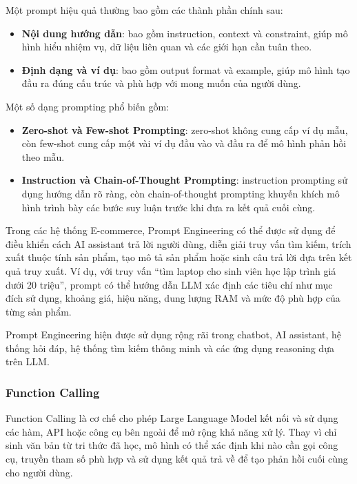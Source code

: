 Một prompt hiệu quả thường bao gồm các thành phần chính sau:

\begin{itemize}
    \item \textbf{Nội dung hướng dẫn}: bao gồm instruction, context và constraint, giúp mô hình hiểu nhiệm vụ, dữ liệu liên quan và các giới hạn cần tuân theo.
    \item \textbf{Định dạng và ví dụ}: bao gồm output format và example, giúp mô hình tạo đầu ra đúng cấu trúc và phù hợp với mong muốn của người dùng.
\end{itemize}

Một số dạng prompting phổ biến gồm:

\begin{itemize}
    \item \textbf{Zero-shot và Few-shot Prompting}: zero-shot không cung cấp ví dụ mẫu, còn few-shot cung cấp một vài ví dụ đầu vào và đầu ra để mô hình phản hồi theo mẫu.
    \item \textbf{Instruction và Chain-of-Thought Prompting}: instruction prompting sử dụng hướng dẫn rõ ràng, còn chain-of-thought prompting khuyến khích mô hình trình bày các bước suy luận trước khi đưa ra kết quả cuối cùng.
\end{itemize}

Trong các hệ thống E-commerce, Prompt Engineering có thể được sử dụng để điều khiển cách AI assistant trả lời người dùng, diễn giải truy vấn tìm kiếm, trích xuất thuộc tính sản phẩm, tạo mô tả sản phẩm hoặc sinh câu trả lời dựa trên kết quả truy xuất. Ví dụ, với truy vấn ``tìm laptop cho sinh viên học lập trình giá dưới 20 triệu'', prompt có thể hướng dẫn LLM xác định các tiêu chí như mục đích sử dụng, khoảng giá, hiệu năng, dung lượng RAM và mức độ phù hợp của từng sản phẩm.

Prompt Engineering hiện được sử dụng rộng rãi trong chatbot, AI assistant, hệ thống hỏi đáp, hệ thống tìm kiếm thông minh và các ứng dụng reasoning dựa trên LLM.

\subsubsection{Function Calling}

Function Calling là cơ chế cho phép Large Language Model kết nối và sử dụng các hàm, API hoặc công cụ bên ngoài để mở rộng khả năng xử lý. Thay vì chỉ sinh văn bản từ tri thức đã học, mô hình có thể xác định khi nào cần gọi công cụ, truyền tham số phù hợp và sử dụng kết quả trả về để tạo phản hồi cuối cùng cho người dùng.

